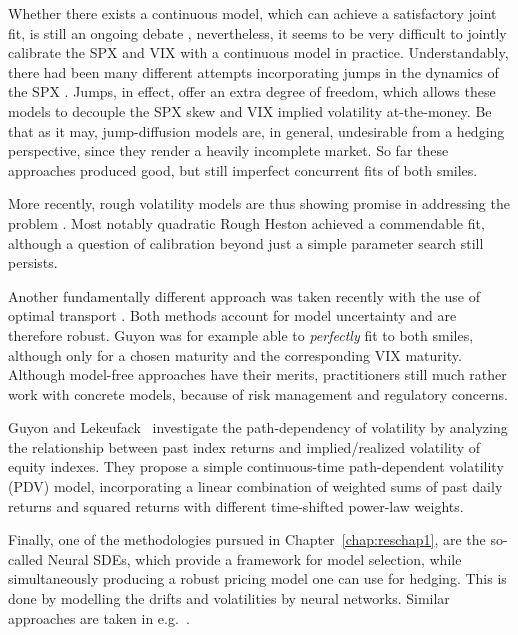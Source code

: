 Whether there exists a continuous model, which can achieve a satisfactory joint fit, is still an ongoing debate \cite{Acciaio2020ShortFutures, Guyon2019InversionMarket}, nevertheless, it seems to be very difficult to jointly calibrate the SPX and VIX with a continuous model in practice. Understandably, there had been many different attempts incorporating jumps in the dynamics of the SPX \cite{Cont2011ADERIVATIVES, Baldeaux2014ConsistentModel, Bardgett2013InferringMarkets, Papanicolaou2014AVolatilities, Kokholm2015JointModels, Pacati2018SmilingModel}. Jumps, in effect, offer an extra degree of freedom, which allows these models to decouple the SPX skew and VIX implied volatility at-the-money. Be that as it may, jump-diffusion models are, in general, undesirable from a hedging perspective, since they render a heavily incomplete market. So far these approaches produced good, but still imperfect concurrent fits of both smiles.

More recently, rough volatility models are thus showing promise in addressing the problem \cite{Jacquier2021RoughOptions, Horvath2020VolatilityModels, DeMarco2018VolatilityModels}. Most notably quadratic Rough Heston \cite{Gatheral2020TheProblem} achieved a commendable fit, although a question of calibration beyond just a simple parameter search still persists.

Another fundamentally different approach was taken recently with the use of optimal transport \cite{Guyon2019TheSolved, Guo2020JointTransport}. Both methods account for model uncertainty and are therefore robust. Guyon \cite{Guyon2019TheSolved} was for example able to \textit{perfectly} fit to both smiles, although only for a chosen maturity and the corresponding VIX maturity. Although model-free approaches have their merits, practitioners still much rather work with concrete models, because of risk management and regulatory concerns. 

Guyon and Lekeufack~\cite{Guyon2022VolatilityPath-Dependent} investigate the path-dependency of volatility by analyzing the relationship between past index returns and implied/realized volatility of equity indexes. They propose a simple continuous-time path-dependent volatility (PDV) model, incorporating a linear combination of weighted sums of past daily returns and squared returns with different time-shifted power-law weights.

Finally, one of the methodologies pursued in Chapter~\ref{chap:reschap1}, are the so-called Neural SDEs, which provide a framework for model selection, while simultaneously producing a robust pricing model one can use for hedging. This is done by modelling the drifts and volatilities by neural networks. Similar approaches are taken in e.g.~\cite{Guyon2022NeuralCalibration, Cuchiero2020AModels}.

